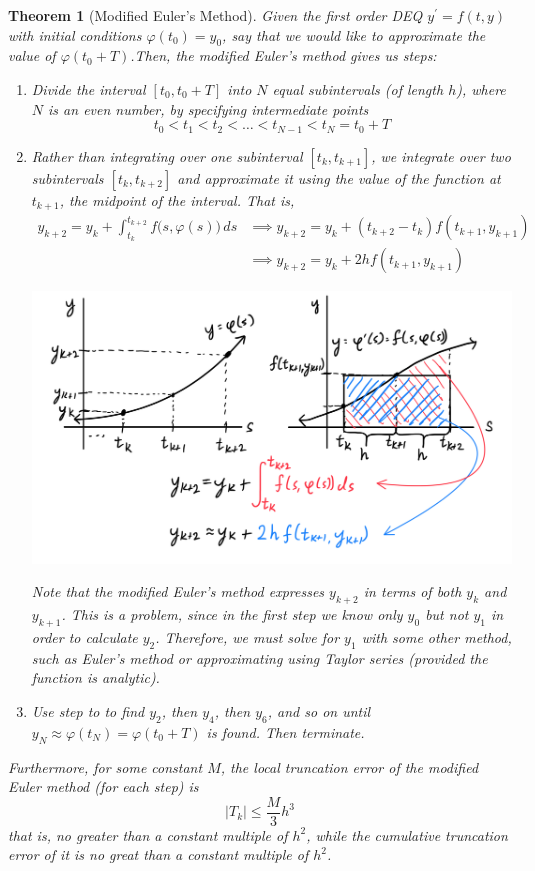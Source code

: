 \documentclass{article}
\newtheorem{theorem}{Theorem}[section]
\theoremstyle{remark}
\theoremstyle{definition}
\begin{document}
\begin{theorem}[Modified Euler's Method]
Given the first order DEQ $y^\prime = f(t, y)$ with initial conditions $\varphi(t_0) = y_0$, say that we would like to approximate the value of $\varphi(t_0 + T)$.Then, the \textit{modified Euler's method} gives us steps: 
\begin{enumerate}
    \item Divide the interval $[t_0, t_0 + T]$ into $N$ equal subintervals (of length $h$), where $N$ is an even number, by specifying intermediate points
    \[t_0 < t_1 < t_2 < \ldots < t_{N-1} < t_N = t_0 + T\]
    \item Rather than integrating over one subinterval $[t_k, t_{k+1}]$, we integrate over two subintervals $[t_k, t_{k+2}]$ and approximate it using the value of the function at $t_{k+1}$, the midpoint of the interval. That is, 
    \begin{align*}
        y_{k+2} = y_k + \int_{t_k}^{t_{k+2}} f\big(s, \varphi(s)\big)\,ds & \implies y_{k+2} = y_k + (t_{k+2} - t_k) f(t_{k+1}, y_{k+1}) \\
        & \implies y_{k+2} = y_k + 2 h f(t_{k+1}, y_{k+1})
    \end{align*}
    \begin{center}
        \includegraphics[scale=0.25]{img/Modified_Euler_Method.PNG}
    \end{center}
    Note that the modified Euler's method expresses $y_{k+2}$ in terms of both $y_k$ and $y_{k+1}$. This is a problem, since in the first step we know only $y_0$ but not $y_1$ in order to calculate $y_2$. Therefore, we must solve for $y_1$ with some other method, such as Euler's method or approximating using Taylor series (provided the function is analytic). 
    \item Use step to to find $y_2$, then $y_4$, then $y_6$, and so on until $y_N \approx \varphi(t_N) = \varphi(t_0 + T)$ is found. Then terminate. 
\end{enumerate}
Furthermore, for some constant $M$, the local truncation error of the modified Euler method (for each step) is 
\[|T_k| \leq \frac{M}{3} h^3\]
that is, no greater than a constant multiple of $h^2$, while the cumulative truncation error of it is no great than a constant multiple of $h^2$. 
\end{theorem}
\end{document}
